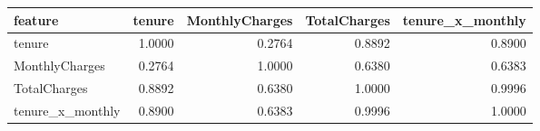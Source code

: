 \begin{tabular}{lrrrr}
\toprule
feature & tenure & MonthlyCharges & TotalCharges & tenure\_x\_monthly \\
\midrule
tenure & 1.0000 & 0.2764 & 0.8892 & 0.8900 \\
MonthlyCharges & 0.2764 & 1.0000 & 0.6380 & 0.6383 \\
TotalCharges & 0.8892 & 0.6380 & 1.0000 & 0.9996 \\
tenure\_x\_monthly & 0.8900 & 0.6383 & 0.9996 & 1.0000 \\
\bottomrule
\end{tabular}
